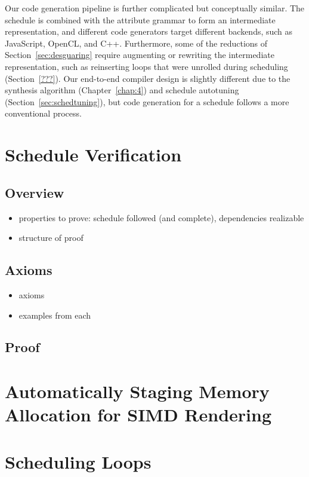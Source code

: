 Our code generation pipeline is further complicated but conceptually similar. The schedule is combined with the attribute grammar to form an intermediate representation, and different code generators target different backends, such as JavaScript, OpenCL, and C++. Furthermore, some of the reductions of Section~\ref{sec:desguaring} require augmenting or rewriting the intermediate representation, such as reinserting loops that were unrolled during scheduling (Section~\ref{???}). Our end-to-end compiler design is slightly different due to the synthesis algorithm (Chapter~\ref{chap:4})  and schedule autotuning (Section~\ref{sec:schedtuning}), but code generation for a schedule follows a more conventional process.



\section{Schedule Verification}
\subsection{Overview}
\begin{itemize}
\item properties to prove: schedule followed (and complete), dependencies realizable 
\item structure of proof
\end{itemize}
\subsection{Axioms}
\begin{itemize}
\item axioms
\item examples from each
\end{itemize}
\subsection{Proof}

\section{Automatically Staging Memory Allocation for SIMD Rendering}


\section{Scheduling Loops}


